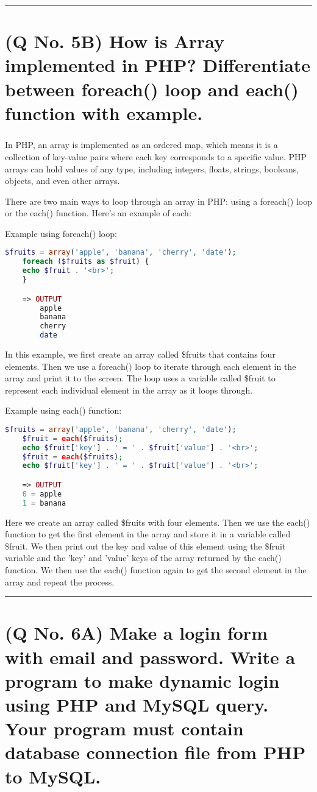 \documentclass[11pt]{article}
\begin{document}
\noindent\rule{\linewidth}{0.4pt}
\section{(Q No. 5B) How is Array implemented in PHP? Differentiate between foreach() loop and each() function with example.}
\subparagraph{}
In PHP, an array is implemented as an ordered map, which means it is a collection of key-value pairs where each key corresponds to a specific value. PHP arrays can hold values of any type, including integers, floats, strings, booleans, objects, and even other arrays.

There are two main ways to loop through an array in PHP: using a foreach() loop or the each() function. Here's an example of each:

Example using foreach() loop:
\begin{lstlisting}[language=php]
    $fruits = array('apple', 'banana', 'cherry', 'date');
    foreach ($fruits as $fruit) {
    echo $fruit . '<br>';
    }

    => OUTPUT 
        apple
        banana
        cherry
        date
\end{lstlisting}
In this example, we first create an array called \$fruits that contains four elements. Then we use a foreach() loop to iterate through each element in the array and print it to the screen. The loop uses a variable called \$fruit to represent each individual element in the array as it loops through.

Example using each() function:
\begin{lstlisting}[language=php]
    $fruits = array('apple', 'banana', 'cherry', 'date');
    $fruit = each($fruits);
    echo $fruit['key'] . ' = ' . $fruit['value'] . '<br>';
    $fruit = each($fruits);
    echo $fruit['key'] . ' = ' . $fruit['value'] . '<br>';

    => OUTPUT
    0 = apple
    1 = banana

\end{lstlisting}
Here we create an array called \$fruits with four elements. Then we use the each() function to get the first element in the array and store it in a variable called \$fruit. We then print out the key and value of this element using the \$fruit variable and the 'key' and 'value' keys of the array returned by the each() function. We then use the each() function again to get the second element in the array and repeat the process.

\noindent\rule{\linewidth}{0.4pt}
\section{(Q No. 6A) Make a login form with email and password. Write a program to make dynamic login using PHP and MySQL query. Your program must contain database connection file from PHP to MySQL.}
\subparagraph{}
\end{document}
